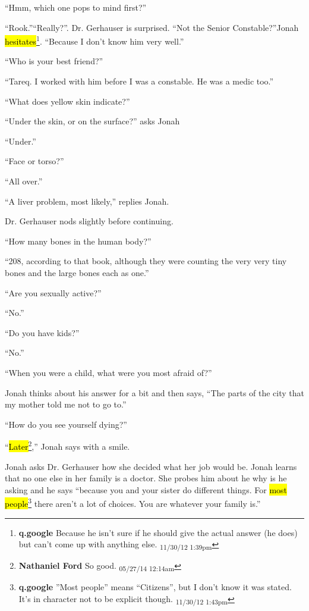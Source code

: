 ``Hmm, which one pops to mind first?''

``Rook.''``Really?''.  Dr. Gerhauser is surprised. ``Not the Senior Constable?''Jonah \hl{hesitates}\footnote{\textbf{q.google }Because he isn't sure if he should give the actual answer (he does) but can't come up with anything else. \textsubscript{11/30/12 1:39pm}}.  ``Because I don't know him very well.''

``Who is your best friend?''

``Tareq.  I worked with him before I was a constable.  He was a medic too.''

``What does yellow skin indicate?''

``Under the skin, or on the surface?'' asks Jonah

``Under.''

``Face or torso?''

``All over.''

``A liver problem, most likely,'' replies Jonah.

Dr. Gerhauser nods slightly before continuing.

``How many bones in the human body?''

``208, according to that book, although they were counting the very very tiny bones and the large bones each as one.''

``Are you sexually active?''

``No.''

``Do you have kids?''

``No.''

``When you were a child, what were you most afraid of?''

Jonah thinks about his answer for a bit and then says, ``The parts of the city that my mother told me not to go to.''

``How do you see yourself dying?''

``\hl{Later}\footnote{\textbf{Nathaniel Ford }So good. \textsubscript{05/27/14 12:14am}},'' Jonah says with a smile. 



Jonah asks Dr. Gerhauser how she decided what her job would be.  Jonah learns that no one else in her family is a doctor.  She probes him about he why is he asking and he says ``because you and your sister do different things.  For \hl{most people}\footnote{\textbf{q.google }''Most people'' means ``Citizens'', but I don't know it was stated.  It's in character not to be explicit though. \textsubscript{11/30/12 1:43pm}} there aren't a lot of choices.  You are whatever your family is.''

